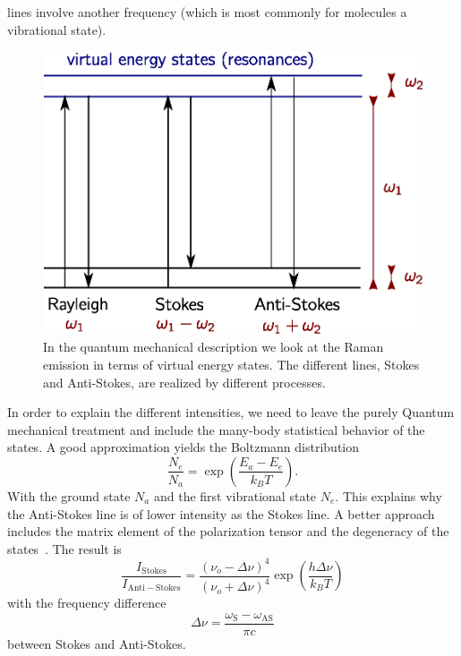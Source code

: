 lines involve another frequency (which is most commonly for molecules a vibrational state). 
\begin{figure}[htpb]
\centering
    \includegraphics[width=0.6\linewidth]{figures/qm_states.eps}
    \caption{In the quantum mechanical description we look at the Raman emission in terms of virtual energy states.
    The different lines, Stokes and Anti-Stokes, are realized by different processes.}
\label{fig:qm_states}
\end{figure}
In order to explain
the different intensities, we need to leave the purely Quantum mechanical treatment and include the many-body
statistical behavior of the states. A good approximation yields the Boltzmann distribution
\begin{equation}
    \frac{N_e}{N_a} = \exp\left (\frac{E_a - E_e}{k_B T}\right ).
\end{equation}
With the ground state $N_a$ and the first vibrational state $N_e$. This explains why the Anti-Stokes line
is of lower intensity as the Stokes line. A better approach includes the matrix element of the polarization tensor and
the degeneracy of the states~\cite{ver}. The result is 
\begin{equation}
    \label{eq:temp}
    \frac{I_{\mathrm{Stokes}}}{I_{\mathrm{Anti-Stokes} }} = \frac{(\nu_o - \Delta \nu)^4}{(\nu_o + \Delta \nu)^4} 
    \exp \left( \frac{h\Delta \nu}{k_BT} \right)
\end{equation}
with the frequency difference 
\begin{equation}
\Delta \nu = \frac{\omega_\mathrm{S} - \omega_{\mathrm{AS}}}{\pi c} 
\end{equation}
between Stokes and Anti-Stokes.


